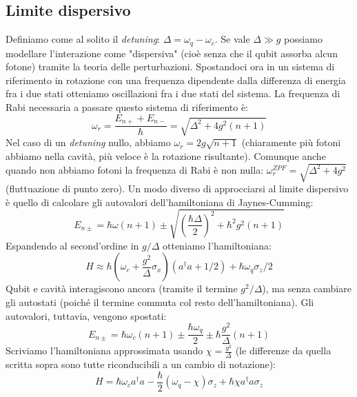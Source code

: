 \subsection{Limite dispersivo}
Definiamo come al solito il \textit{detuning}: $\Delta = \omega_q - \omega_c$. Se vale $\Delta \gg g$ possiamo modellare l'interazione come "dispersiva" (cioè senza che il qubit assorba alcun fotone) tramite la teoria delle perturbazioni.
Spostandoci ora in un sistema di riferimento in rotazione con una frequenza dipendente dalla differenza di energia fra i due stati otteniamo oscillazioni fra i due stati del sistema. La frequenza di Rabi necessaria a passare questo sistema di riferimento è:
\begin{equation*}
    \omega_r=\frac{E_{n+}+E_{n-}}{\hbar}=\sqrt{\Delta^2+4g^2(n+1)}
\end{equation*}
Nel caso di un \textit{detuning} nullo, abbiamo $\omega_r = 2g\sqrt{n+1}$ (chiaramente più fotoni abbiamo nella cavità, più veloce è la rotazione risultante). Comunque anche quando non abbiamo fotoni la frequenza di Rabi è non nulla: $\omega_r^{ZPF}=\sqrt{\Delta^2 + 4g^2}$ (fluttuazione di punto zero).
Un modo diverso di approcciarsi al limite dispersivo è quello di calcolare gli autovalori dell'hamiltoniana di Jaynes-Cumming:
\begin{equation*}
    E_{n\pm} = \hbar \omega (n + 1) \pm \sqrt{\left(\frac{\hbar\Delta}{2}\right)^2+\hbar^2g^2(n+1)}
\end{equation*} 
Espandendo al second'ordine in $g/\Delta$ otteniamo l'hamiltoniana:
\begin{equation*}
    H\approx \hbar \left( \omega_c + \frac{g^2}{\Delta} \sigma_x \right) (a^\dagger a + 1/2) + \hbar \omega_q \sigma_z /2
\end{equation*}
Qubit e cavità interagiscono ancora (tramite il termine $g^2/\Delta$), ma senza cambiare gli autostati (poiché il termine commuta col resto dell'hamiltoniana). Gli autovalori, tuttavia, vengono spostati:
\begin{equation*}
    E_{n\pm} = \hbar \omega_c (n + 1) \pm \frac{\hbar \omega_q}{2} \pm \hbar \frac{g^2}{\Delta}(n+1)
\end{equation*}
Scriviamo l'hamiltoniana approssimata usando $\chi=\frac{ g^2}{\Delta}$ (le differenze da quella scritta sopra sono tutte riconducibili a un cambio di notazione):
\begin{equation*}
    H = \hbar \omega_c a^\dagger a - \frac{\hbar}{2} (\omega_q - \chi ) \sigma_z + \hbar \chi a^\dagger a \sigma_z
\end{equation*}

